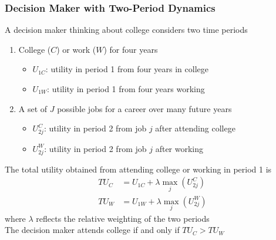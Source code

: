 \documentclass{beamer}
\begin{document}
\begin{frame}\frametitle{Decision Maker with Two-Period Dynamics}
    A decision maker thinking about college considers two time periods
    \begin{enumerate}
        \item College ($C$) or work ($W$) for four years
        \begin{itemize}
            \item $U_{1C}$: utility in period 1 from four years in college
            \item $U_{1W}$: utility in period 1 from four years working
        \end{itemize}
        \item A set of $J$ possible jobs for a career over many future years
        \begin{itemize}
            \item $U_{2j}^C$: utility in period 2 from job $j$ after attending college
            \item $U_{2j}^W$: utility in period 2 from job $j$ after working
        \end{itemize}
    \end{enumerate}
    \vspace{2ex}
    The total utility obtained from attending college or working in period 1 is
    \begin{align*}
        TU_C &= U_{1C} + \lambda \max_j(U_{2j}^C) \\
        TU_W &= U_{1W} + \lambda \max_j(U_{2j}^W)
    \end{align*}
    where $\lambda$ reflects the relative weighting of the two periods \\
    \vspace{2ex}
    The decision maker attends college if and only if $TU_C > TU_W$
\end{frame}
\end{document}
